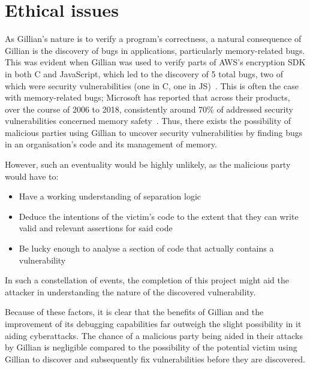 
\chapter{Ethical issues}\label{cha:ethics}

As Gillian's nature is to verify a program's correctness, a natural consequence of Gillian is the discovery of bugs in applications, particularly memory-related bugs.
This was evident when Gillian was used to verify parts of AWS's encryption SDK in both C and JavaScript, which led to the discovery of 5 total bugs, two of which were security vulnerabilities (one in C, one in JS)~\cite{gillian-part2}.
This is often the case with memory-related bugs; Microsoft has reported that across their products, over the course of 2006 to 2018, consistently around 70\% of addressed security vulnerabilities concerned memory safety~\cite{microsoft-memory-bugs}.
Thus, there exists the possibility of malicious parties using Gillian to uncover security vulnerabilities by finding bugs in an organisation's code and its management of memory.

However, such an eventuality would be highly unlikely, as the malicious party would have to:
\begin{itemize}
  \item Have a working understanding of separation logic
  \item Deduce the intentions of the victim's code to the extent that they can write valid and relevant assertions for said code
  \item Be lucky enough to analyse a section of code that actually contains a vulnerability
\end{itemize}

In such a constellation of events, the completion of this project might aid the attacker in understanding the nature of the discovered vulnerability.

Because of these factors, it is clear that the benefits of Gillian and the improvement of its debugging capabilities far outweigh the slight possibility in it aiding cyberattacks.
The chance of a malicious party being aided in their attacks by Gillian is negligible compared to the possibility of the potential victim using Gillian to discover and subsequently fix vulnerabilities before they are discovered.
